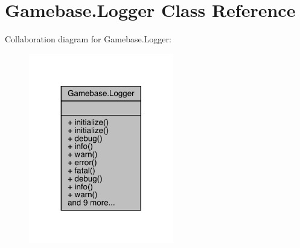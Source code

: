 \hypertarget{classcom_1_1toast_1_1android_1_1gamebase_1_1_gamebase_1_1_logger}{}\section{Gamebase.\+Logger Class Reference}
\label{classcom_1_1toast_1_1android_1_1gamebase_1_1_gamebase_1_1_logger}


Collaboration diagram for Gamebase.\+Logger\+:
\nopagebreak
\begin{figure}[H]
\begin{center}
\leavevmode
\includegraphics[width=179pt]{classcom_1_1toast_1_1android_1_1gamebase_1_1_gamebase_1_1_logger__coll__graph}
\end{center}
\end{figure}

